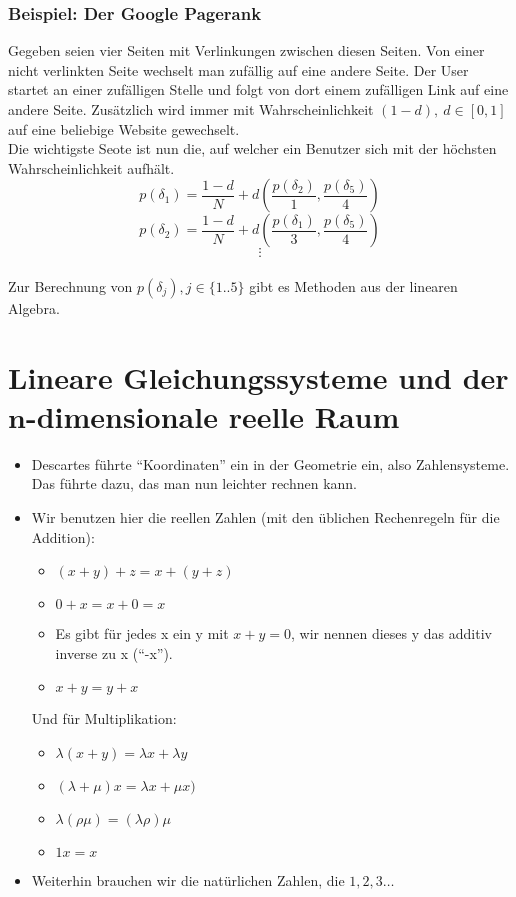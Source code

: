 \documentclass{report}
\newcommand{\lb}{\lambda}
\theoremstyle{customrem}
\theoremstyle{customdef}
\begin{document}
\subsection*{Beispiel: Der Google Pagerank}
Gegeben seien vier Seiten mit Verlinkungen zwischen diesen Seiten. Von einer nicht verlinkten Seite wechselt man zufällig auf eine andere Seite. Der User startet an einer zufälligen Stelle und folgt von dort einem zufälligen Link auf eine andere Seite. Zusätzlich wird immer mit Wahrscheinlichkeit $(1-d), \ d \in [0, 1]$ auf eine beliebige Website gewechselt.\\
Die wichtigste Seote ist nun die, auf welcher ein Benutzer sich mit der höchsten Wahrscheinlichkeit aufhält.\\
$$
p(\delta_1) = \frac{1-d}{N} + d\left(\frac{p(\delta_2)}{1}, \frac{p(\delta_5)}{4}\right)$$$$
p(\delta_2) = \frac{1-d}{N} + d\left(\frac{p(\delta_1)}{3}, \frac{p(\delta_5)}{4}\right)$$$$
\vdots
$$\\
Zur Berechnung von $p(\delta_j), j \in \{1..5\}$ gibt es Methoden aus der linearen Algebra.
\newpage
\tableofcontents
\newpage

\chapter{Lineare Gleichungssysteme und der \\ $\mathbf{n}$-dimensionale reelle Raum}

\begin{itemize}
	\item Descartes führte ``Koordinaten'' ein in der Geometrie ein, also Zahlensysteme. Das führte dazu, das man nun leichter rechnen kann.
	\item Wir benutzen hier die reellen Zahlen (mit den üblichen Rechenregeln für die Addition):
		\begin{itemize}
			\item $(x + y) + z = x + (y + z)$ \\
			\item $0 + x = x + 0 = x$ 
			\item Es gibt für jedes x ein y mit $x + y = 0$, wir nennen dieses y das additiv inverse zu x (``-x'').
			\item $x + y = y + x$
		\end{itemize}
		Und für Multiplikation:
		\begin{itemize}
			\item $\lambda (x + y) = \lambda x + \lambda y$ 
			\item $(\lambda + \mu) x = \lambda x + \mu x)$
			\item $\lb(\rho\mu)=(\lb\rho)\mu$
			\item $1x = x$
		\end{itemize}
	\item Weiterhin brauchen wir die natürlichen Zahlen, die $1,2,3\dots$
\end{itemize}
\end{document}
